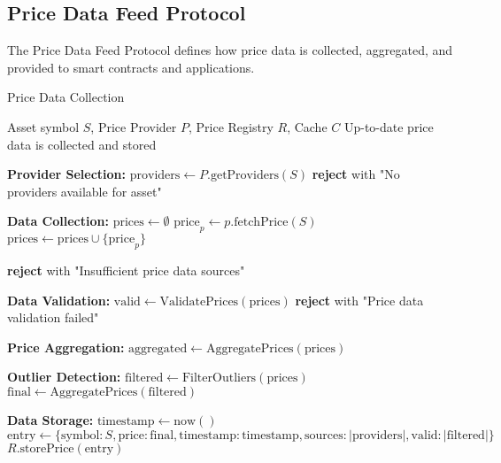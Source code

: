 \subsection{Price Data Feed Protocol}
\label{subsec:price-feed-protocol}

The Price Data Feed Protocol defines how price data is collected, aggregated, and provided to smart contracts and applications.

\begin{tcolorbox}[
    enhanced,
    colback=blue!5!white,
    colframe=blue!75!black,
    arc=5mm,
    boxrule=1.5pt,
    title=Price Data Collection Protocol,
    fonttitle=\bfseries,
    coltitle=white,
    attach boxed title to top left={yshift=-2mm, xshift=5mm},
    boxed title style={colback=blue!75!black, rounded corners},
    shadow={2mm}{-2mm}{0mm}{black!50},
    drop fuzzy shadow
]
\begin{protocol}{Price Data Collection}
\label{prot:price-data-collection}
\begin{algorithmic}[1]
\Require Asset symbol $S$, Price Provider $P$, Price Registry $R$, Cache $C$
\Ensure Up-to-date price data is collected and stored

\State \textbf{Provider Selection:}
\State $\text{providers} \gets P.\text{getProviders}(S)$
    \State \textbf{reject} with "No providers available for asset"
\EndIf

\State \textbf{Data Collection:}
\State $\text{prices} \gets \emptyset$
    \State $\text{price}_p \gets p.\text{fetchPrice}(S)$
        \State $\text{prices} \gets \text{prices} \cup \{\text{price}_p\}$
    \EndIf
\EndFor

    \State \textbf{reject} with "Insufficient price data sources"
\EndIf

\State \textbf{Data Validation:}
\State $\text{valid} \gets \text{ValidatePrices}(\text{prices})$
    \State \textbf{reject} with "Price data validation failed"
\EndIf

\State \textbf{Price Aggregation:}
\State $\text{aggregated} \gets \text{AggregatePrices}(\text{prices})$

\State \textbf{Outlier Detection:}
\State $\text{filtered} \gets \text{FilterOutliers}(\text{prices})$
\State $\text{final} \gets \text{AggregatePrices}(\text{filtered})$

\State \textbf{Data Storage:}
\State $\text{timestamp} \gets \text{now}()$
\State $\text{entry} \gets \{\text{symbol}: S, \text{price}: \text{final}, \text{timestamp}: \text{timestamp}, \text{sources}: |\text{providers}|, \text{valid}: |\text{filtered}|\}$
\State $R.\text{storePrice}(\text{entry})$


\end{algorithmic}
\end{protocol}
\end{tcolorbox}
